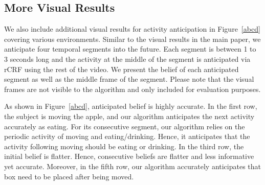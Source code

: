 \documentclass[conference]{IEEEtran}
\begin{document}
\subsection{More Visual Results}
We also include additional visual results for activity anticipation in Figure~\ref{abcd} covering various environments. Similar to the visual results in the main paper, we anticipate four temporal segments into the future. Each segment is between 1 to 3 seconds long and the activity at the middle of the segment is anticipated via rCRF using the rest of the video. We present the belief of each anticipated segment as well as the middle frame of the segment. Please note that the visual frames are not visible to the algorithm and only included for evaluation purposes.


As shown in Figure~\ref{abcd}, anticipated belief is highly accurate. In the first row, the subject is moving the apple, and our algorithm anticipates the next activity accurately as eating. For its consecutive segment, our algorithm relies on the periodic activity of moving and eating/drinking. Hence, it anticipates that the activity following moving should be eating or drinking. In the third row, the initial belief is flatter. Hence, consecutive beliefs are flatter and less informative yet accurate. Moreover, in the fifth row, our algorithm accurately anticipates that box need to be placed after being moved.

{\small



}
\end{document}
